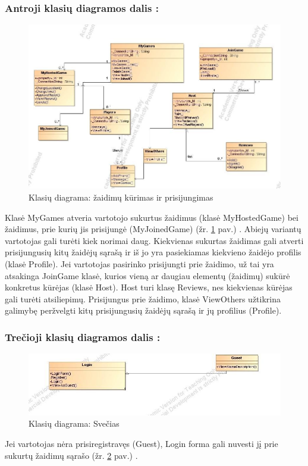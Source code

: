 \documentclass{VUMIFPSkursinis}
\begin{document}
		\subsubsection*{Antroji klasių diagramos dalis :}
			\begin{figure}[H]
				\centering
				\includegraphics[scale=0.5]{img/BoardGamesClassDiagrampt1}
				\caption{Klasių diagrama: žaidimų kūrimas ir prisijungimas}
				\label{img:BoardGamesClassDiagrampt1}
			\end{figure}
			Klasė MyGames atveria vartotojo sukurtus žaidimus (klasė MyHostedGame) bei žaidimus, prie kurių jis prisijungė (MyJoinedGame) (žr. \ref{img:BoardGamesClassDiagrampt1} pav.) . Abiejų variantų vartotojas gali turėti kiek norimai daug. Kiekvienas sukurtas žaidimas gali atverti prisijungusių kitų žaidėjų sąrašą ir iš jo yra pasiekiamas kiekvieno žaidėjo profilis (klasė Profile). Jei vartotojas pasirinko prisijungti prie žaidimo, už tai yra atsakinga JoinGame klasė, kurios vieną ar daugiau elementų (žaidimų) sukūrė konkretus kūrėjas (klasė Host). Host turi klasę Reviews, nes kiekvienas kūrėjas gali turėti atsiliepimų. Prisijungus prie žaidimo, klasė ViewOthers užtikrina galimybę peržvelgti kitų prisijungusių žaidėjų sąrašą ir jų profilius (Profile).
		\subsubsection*{Trečioji klasių diagramos dalis :}
			\begin{figure}[H]
				\centering
				\includegraphics[scale=0.5]{img/BoardGamesClassDiagrampt2}
				\caption{Klasių diagrama: Svečias}
				\label{img:BoardGamesClassDiagrampt2}
			\end{figure}
			Jei vartotojas nėra prisiregistravęs (Guest), Login forma gali nuvesti jį prie sukurtų žaidimų sąrašo (žr. \ref{img:BoardGamesClassDiagrampt2} pav.) .
\end{document}
